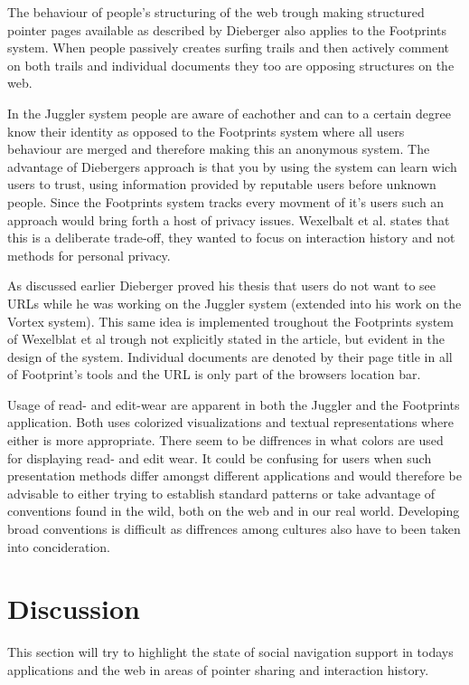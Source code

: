 \documentclass[12pt,a4paper]{article}
\begin{document}
The behaviour of people's structuring of the web trough making structured
pointer pages available as described by Dieberger also applies to the
Footprints system. When people passively creates surfing trails and then
actively comment on both trails and individual documents they too are opposing
structures on the web.

In the Juggler system people are aware of eachother and can to a certain
degree know their identity as opposed to the Footprints system where all users
behaviour are merged and therefore making this an anonymous system. The
advantage of Diebergers approach is that you by using the system can learn
wich users to trust, using information provided by reputable users
before unknown people. Since the Footprints system tracks every movment of
it's users such an approach would bring forth a host of privacy issues.
Wexelbalt et al. states that this is a deliberate trade-off, they wanted to
focus on interaction history and not methods for personal privacy.

As discussed earlier Dieberger proved his thesis that users do not want to see
URLs while he was working on the Juggler system (extended into his work on the
Vortex system). This same idea is implemented
troughout the Footprints system of Wexelblat et al
trough not explicitly stated in the article, but evident in the design
of the system. Individual documents are denoted by their page title in all of
Footprint's tools and the URL is only part of the browsers location bar.

Usage of read- and edit-wear are apparent in both the Juggler and the
Footprints application. Both uses colorized visualizations and textual
representations where either is more appropriate. There seem to be diffrences
in what colors are used for displaying read- and edit wear. It could be
confusing for users when such presentation methods differ amongst different
applications and would therefore be advisable to either trying to establish
standard patterns or take advantage of conventions found in the wild, both on
the web and in our real world. Developing broad conventions is difficult as
diffrences among cultures also have to been taken into concideration.

\section{Discussion}

This section will try to highlight the state of social navigation support in
todays applications and the web in areas of pointer sharing and interaction
history.
\end{document}
